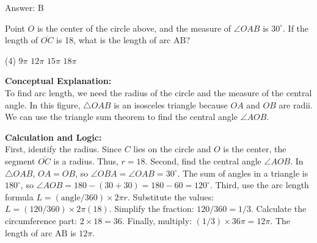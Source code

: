 \documentclass[11pt,paper=a4,answers]{exam}
\begin{document}
\begin{questions}
\begin{solution}
\vspace{30pt}

Answer: \colorbox{yellow!100}{B}
\end{solution}

\vspace{60pt}

\question
\begin{center}
\end{center}
Point $O$ is the center of the circle above, and the measure of $\angle OAB$ is $30^\circ$. If the length of $\overline{OC}$ is 18, what is the length of arc $\text{AB}$?
\begin{tasks}(4)
    \task $9\pi$
    \task $12\pi$
    \task $15\pi$
    \task $18\pi$
\end{tasks}

\begin{solution}
\textbf{Conceptual Explanation:} \\
To find arc length, we need the radius of the circle and the measure of the central angle. In this figure, $\triangle OAB$ is an isosceles triangle because $OA$ and $OB$ are radii. We can use the triangle sum theorem to find the central angle $\angle AOB$.

\vspace{30pt}

\textbf{Calculation and Logic:} \\
First, identify the radius. Since $C$ lies on the circle and $O$ is the center, the segment $\overline{OC}$ is a radius. Thus, $r = 18$. Second, find the central angle $\angle AOB$. In $\triangle OAB$, $OA = OB$, so $\angle OBA = \angle OAB = 30^\circ$. The sum of angles in a triangle is $180^\circ$, so $\angle AOB = 180 - (30 + 30) = 180 - 60 = 120^\circ$. Third, use the arc length formula $L = ( \text{angle} / 360 ) \times 2\pi r$. Substitute the values: $L = ( 120 / 360 ) \times 2\pi(18)$. Simplify the fraction: $120/360 = 1/3$. Calculate the circumference part: $2 \times 18 = 36$. Finally, multiply: $(1/3) \times 36\pi = 12\pi$. The length of arc $\text{AB}$ is $12\pi$.


\end{solution}
\end{questions}
\end{document}
